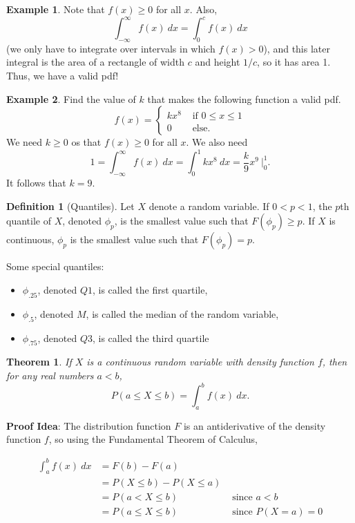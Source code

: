 \documentclass[
]{book}
\providecommand{\tightlist}{%
  \setlength{\itemsep}{0pt}\setlength{\parskip}{0pt}}
\newtheorem{theorem}{Theorem}[chapter]
\theoremstyle{definition}
\newtheorem{definition}{Definition}[chapter]
\theoremstyle{definition}
\newtheorem{example}{Example}[chapter]
\theoremstyle{definition}
\theoremstyle{definition}
\theoremstyle{remark}
\begin{document}
\begin{example}
Note that \(f(x) \geq 0\) for all \(x\). Also, \[\int_{-\infty}^{\infty} f(x)~dx = \int_0^c f(x)~dx\] (we only have to integrate over intervals in which \(f(x) > 0\)), and this later integral is the area of a rectangle of width \(c\) and height \(1/c\), so it has area 1. Thus, we have a valid pdf!
\end{example}

\begin{example}
Find the value of \(k\) that makes the following function a valid pdf.
\[
f(x)=
\begin{cases}
kx^8 &\text{ if }0 \leq x \leq 1 \\
0 &\text{ else.}
\end{cases}
\]
We need \(k \geq 0\) os that \(f(x) \geq 0\) for all \(x\). We also need
\[1 = \int_{-\infty}^\infty f(x)~dx = \int_0^1 kx^8~dx = \frac{k}{9}x^9 ~\biggr|_0^1.\]
It follows that \(k = 9\).
\end{example}

\begin{definition}[Quantiles]
\protect\hypertarget{def:quantile}{}\label{def:quantile}Let \(X\) denote a random variable. If \(0 < p < 1\), the \(p\)th quantile of \(X\), denoted \(\phi_p\), is the smallest value such that \(F(\phi_p) \geq p\). If \(X\) is continuous, \(\phi_p\) is the smallest value such that \(F(\phi_p) = p\).
\end{definition}

Some special quantiles:

\begin{itemize}
\tightlist
\item
  \(\phi_.25\), denoted \(Q1\), is called the first quartile,
\item
  \(\phi_.5\), denoted \(M\), is called the median of the random variable,
\item
  \(\phi_.75\), denoted \(Q3\), is called the third quartile
\end{itemize}

\begin{theorem}
If \(X\) is a continuous random variable with density function \(f\), then for any real numbers \(a < b\),
\[P(a \leq X \leq b) = \int_a^b f(x)~dx.\]
\end{theorem}

\textbf{Proof Idea}: The distribution function \(F\) is an antiderivative of the density function \(f\), so using the Fundamental Theorem of Calculus,

\begin{align*}
\int_a^b f(x)~dx  &= F(b) - F(a) \\
                  &= P(X\leq b) - P(X \leq a) \\
                  &= P(a < X \leq b) &\text{ since } a < b\\
                  &= P(a \leq X \leq b) &\text{ since } P(X = a) = 0
\end{align*}
\end{document}
